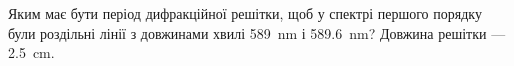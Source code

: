 %
%
^^I^^IЯким має бути період дифракційної решітки, щоб у спектрі першого порядку були роздільні лінії з довжинами хвилі \SI{589}{\nano\metre} і \SI{589.6}{\nano\metre}? Довжина решітки — \SI{2.5}{\centi\metre}.
